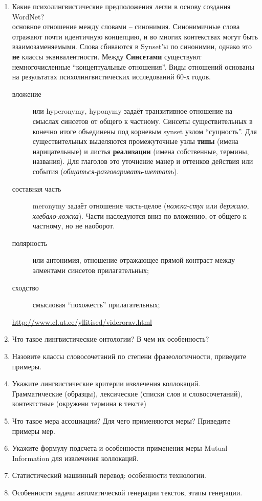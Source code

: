 \documentclass[a4paper]{article}
\newcommand{\eng}[1]{\foreignlanguage{english}{#1}}
\begin{document}
\begin{enumerate}
	\item Какие психолингвистические предположения легли в основу создания WordNet?\hfill\\
	основное отношение между словами -- синонимия. Синонимичные слова отражают почти идентичную концепцию, и во многих контекствах могут быть взаимозаменяемыми. Слова сбиваются в \eng{Synset}'ы по синонимии, однако это \textbf{не} классы эквивалентности. Между \textbf{Синсетами} существуют немногочисленные ``концептуальные отношения''. Виды отношений основаны на результатах психолингвистических исследований 60-х годов. \begin{description}
		\item[вложение] или \eng{hyperonymy}, \eng{hyponymy} задаёт транзитивное отношение на смыслах синсетов от общего к частному. Синсеты существительных в конечно итоге объединены под корневым \eng{synset} узлом ``сущность''. Для существительных выделяются промежуточные узлы \textbf{типы} (имена нарицательные) и листья \textbf{реализации} (имена собственные, термины, названия). Для глаголов это уточнение манер и оттенков действия или события (\emph{общаться}-\emph{разговаривать}-\emph{шептать}). 
		\item[составная часть] \eng{meronymy} задаёт отношение часть-целое (\emph{ножка}-\emph{стул} или \emph{держало}, \emph{хлебало}-\emph{ложка}). Части наследуются вниз по вложению, от общего к частному, но не наоборот.
		\item[полярность] или антонимия, отношение отражающее прямой контраст между элментами синсетов прилагательных;
		\item[сходство] смысловая ``похожесть'' прилагательных; 
	\end{description}
	\url{http://www.cl.ut.ee/yllitised/viderorav.html}


	\item Что такое лингвистические онтологии? В чем их особенность?\hfill\\
	\item Назовите классы словосочетаний по степени фразеологичности, приведите примеры.\hfill\\

	\item Укажите лингвистические критерии извлечения коллокаций.\hfill\\
	Грамматические (образцы), лексические (списки слов и словосочетаний), контектстные (окружени термина в тексте)

	\item Что такое мера ассоциации? Для чего применяются меры? Приведите примеры мер.

	\item Укажите формулу подсчета и особенности применения меры Mutual Information для извлечения коллокаций.

	\item Статистический машинный перевод: особенности технологии.\hfill\\

	\item Особенности задачи автоматической генерации текстов, этапы генерации.\hfill\\
\end{enumerate}
\end{document}
